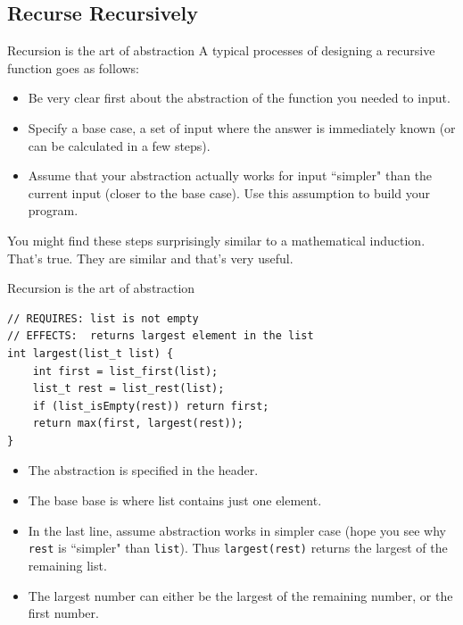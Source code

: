 \subsection{Recurse Recursively}
\begin{frame}{Recursion is the art of abstraction}
A typical processes of designing a recursive function goes as follows:
\begin{itemize}
	\item Be very clear first about the abstraction of the function you needed to input.
	\item Specify a base case, a set of input where the answer is immediately known (or can be calculated in a few steps).
	\item Assume that your abstraction actually works for input ``simpler" than the current input (closer to the base case). Use this assumption to build your program.
\end{itemize}
You might find these steps surprisingly similar to a mathematical induction. That's true. They are similar and that's very useful.
\end{frame}

\begin{frame}[fragile]{Recursion is the art of abstraction}
\begin{verbatim}
// REQUIRES: list is not empty
// EFFECTS:  returns largest element in the list
int largest(list_t list) {
    int first = list_first(list);
    list_t rest = list_rest(list);
    if (list_isEmpty(rest)) return first;
    return max(first, largest(rest));
}
\end{verbatim}
\begin{itemize}
	\item The abstraction is specified in the header.
	\item The base base is where list contains just one element.
	\item In the last line, assume abstraction works in simpler case (hope you see why \texttt{rest} is ``simpler" than \texttt{list}). Thus \texttt{largest(rest)} returns the largest of the remaining list.
	\item The largest number can either be the largest of the remaining number, or the first number. 
\end{itemize}
\end{frame}

